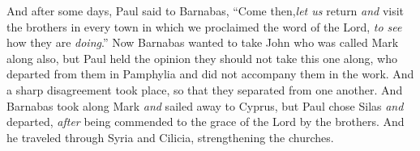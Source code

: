 \begin{biblechapter}
 And after some days, Paul said to Barnabas, “Come then,\textit{let us} return \textit{and} visit the brothers in every town in which we proclaimed the word of the Lord, \textit{to see} how they are \textit{doing}.”
\verse Now Barnabas wanted to take John who was called Mark along also,
\verse but Paul held the opinion they should not take this one along, who departed from them in Pamphylia and did not accompany them in the work.
\verse And a sharp disagreement took place, so that they separated from one another. And Barnabas took along Mark \textit{and} sailed away to Cyprus,
\verse but Paul chose Silas \textit{and} departed, \textit{after} being commended to the grace of the Lord by the brothers.
\verse And he traveled through Syria and Cilicia, strengthening the churches.
\end{biblechapter}

